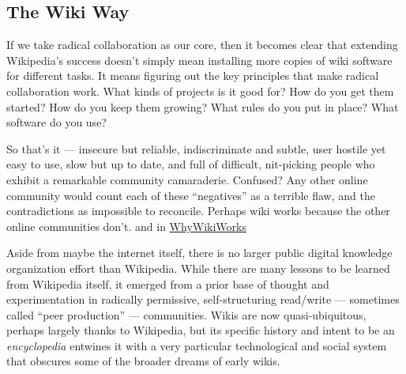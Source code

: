 \hypertarget{the-wiki-way}{%
\subsection{The Wiki Way}\label{the-wiki-way}}

\begin{leftbar}
If we take radical collaboration as our core, then it becomes clear that
extending Wikipedia's success doesn't simply mean installing more copies
of wiki software for different tasks. It means figuring out the key
principles that make radical collaboration work. What kinds of projects
is it good for? How do you get them started? How do you keep them
growing? What rules do you put in place? What software do you use? \citep{swartzMakingMoreWikipedias2006} 
\end{leftbar}

\begin{leftbar}
So that's it --- insecure but reliable, indiscriminate and subtle, user
hostile yet easy to use, slow but up to date, and full of difficult,
nit-picking people who exhibit a remarkable community camaraderie.
Confused? Any other online community would count each of these
``negatives'' as a terrible flaw, and the contradictions as impossible
to reconcile. Perhaps wiki works because the other online communities
don't. \citep{leufWikiWayQuick2001a}  and in
\href{http://wiki.c2.com/?WhyWikiWorks}{WhyWikiWorks}\end{leftbar} 


Aside from maybe the internet itself, there is no larger public digital
knowledge organization effort than Wikipedia. While there are many
lessons to be learned from Wikipedia itself, it emerged from a prior
base of thought and experimentation in radically permissive,
self-structuring read/write --- sometimes called ``peer production''
\citep{hillWikipediaEndOpen2019}  --- communities. Wikis are now
quasi-ubiquitous,
perhaps largely thanks to Wikipedia, but its specific history and intent
to be an \emph{encyclopedia} entwines it with a very particular
technological and social system that obscures some of the broader dreams
of early wikis.

